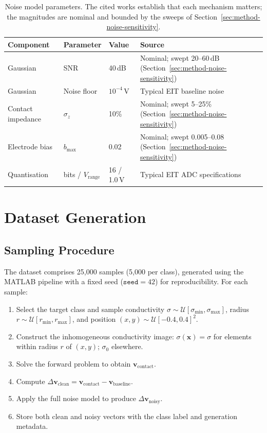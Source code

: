 \begin{table}[htbp]
\centering
\caption[Noise model parameters]{Noise model parameters. The cited works establish that each mechanism matters; the magnitudes are nominal and bounded by the sweeps of Section~\ref{sec:method-noise-sensitivity}.}
\label{tab:noise-params}
\small
\begin{tabularx}{\textwidth}{@{}l l l X@{}}
\toprule
\textbf{Component} & \textbf{Parameter} & \textbf{Value} & \textbf{Source} \\
\midrule
Gaussian & SNR & 40\,dB & Nominal; swept 20--60\,dB (Section~\ref{sec:method-noise-sensitivity}) \\
\midrule
Gaussian & Noise floor & $10^{-4}$\,V & Typical EIT baseline noise \\
\midrule
Contact impedance & $\sigma_z$ & 10\% & Nominal; swept 5--25\% (Section~\ref{sec:method-noise-sensitivity}) \\
\midrule
Electrode bias & $b_{\max}$ & 0.02 & Nominal; swept 0.005--0.08 (Section~\ref{sec:method-noise-sensitivity}) \\
\midrule
Quantisation & bits / $V_{\text{range}}$ & 16 / 1.0\,V & Typical EIT ADC specifications \\
\bottomrule
\end{tabularx}
\end{table}
\section{Dataset Generation}
\label{sec:method-dataset}

\subsection{Sampling Procedure}
\label{sec:method-dataset-sampling}

The dataset comprises 25{,}000 samples (5{,}000 per class), generated using the MATLAB pipeline with a fixed seed ($\texttt{seed} = 42$) for reproducibility. For each sample:

\begin{enumerate}
    \item Select the target class and sample conductivity $\sigma \sim \mathcal{U}[\sigma_{\min}, \sigma_{\max}]$, radius $r \sim \mathcal{U}[r_{\min}, r_{\max}]$, and position $(x, y) \sim \mathcal{U}[-0.4, 0.4]^2$.
    \item Construct the inhomogeneous conductivity image: $\sigma(\mathbf{x}) = \sigma$ for elements within radius $r$ of $(x, y)$; $\sigma_0$ elsewhere.
    \item Solve the forward problem to obtain $\mathbf{v}_{\text{contact}}$.
    \item Compute $\Delta\mathbf{v}_{\text{clean}} = \mathbf{v}_{\text{contact}} - \mathbf{v}_{\text{baseline}}$.
    \item Apply the full noise model to produce $\Delta\mathbf{v}_{\text{noisy}}$.
    \item Store both clean and noisy vectors with the class label and generation metadata.
\end{enumerate}

